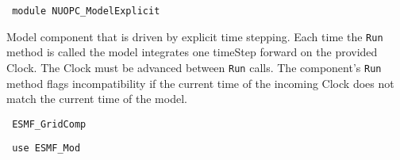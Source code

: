  
\setlength{\parskip}{0pt}
\setlength{\parindent}{0pt}
\setlength{\baselineskip}{11pt}
 
\def\bv{\begin{verbatim}}
\def\ev{\end{verbatim}}
\def\be{\begin{equation}}
\def\ee{\end{equation}}
\def\bea{\begin{eqnarray}}
\def\eea{\end{eqnarray}}
\def\bi{\begin{itemize}}
\def\ei{\end{itemize}}
\def\bn{\begin{enumerate}}
\def\en{\end{enumerate}}
\def\bd{\begin{description}}
\def\ed{\end{description}}
\def\({\left (}
\def\){\right )}
\def\[{\left [}
\def\]{\right ]}
\def\<{\left  \langle}
\def\>{\right \rangle}
\def\cI{{\cal I}}
\def\diag{\mathop{\rm diag}}
\def\tr{\mathop{\rm tr}}


\begin{verbatim} module NUOPC_ModelExplicit
\end{verbatim}

Model component that is driven by explicit time stepping. Each time the {\tt Run} method is called the model integrates one timeStep forward on the provided Clock. The Clock must be advanced between {\tt Run} calls. The component's {\tt Run} method flags incompatibility if the current time of the incoming Clock does not match the current time of the model.

\begin{verbatim} ESMF_GridComp
\end{verbatim}

\begin{verbatim} use ESMF_Mod
\end{verbatim}

